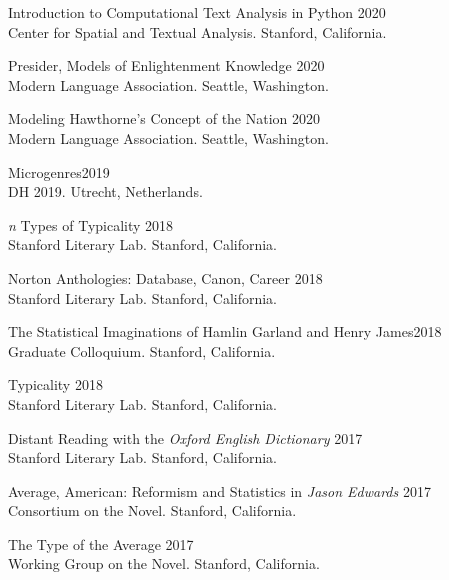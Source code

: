 \documentclass[
  12pt,
  letterpaper,
]{article}
\begin{document}
Introduction to Computational Text Analysis in Python \hfill 2020\\
\hspace*{0.333em} Center for Spatial and Textual Analysis. Stanford,
California.

Presider, Models of Enlightenment Knowledge \hfill 2020\\
\hspace*{0.333em} Modern Language Association. Seattle, Washington.

Modeling Hawthorne's Concept of the Nation \hfill 2020\\
\hspace*{0.333em} Modern Language Association. Seattle, Washington.

Microgenres\hfill 2019\\
\hspace*{0.333em} DH 2019. Utrecht, Netherlands.

\emph{n} Types of Typicality \hfill 2018\\
\hspace*{0.333em} Stanford Literary Lab. Stanford, California.

Norton Anthologies: Database, Canon, Career \hfill 2018\\
\hspace*{0.333em} Stanford Literary Lab. Stanford, California.

The Statistical Imaginations of Hamlin Garland and Henry
James\hfill 2018\\
\hspace*{0.333em} Graduate Colloquium. Stanford, California.

Typicality \hfill 2018\\
\hspace*{0.333em} Stanford Literary Lab. Stanford, California.

Distant Reading with the \emph{Oxford English Dictionary} \hfill 2017\\
\hspace*{0.333em} Stanford Literary Lab. Stanford, California.

Average, American: Reformism and Statistics in \emph{Jason Edwards}
\hfill 2017\\
\hspace*{0.333em} Consortium on the Novel. Stanford, California.

The Type of the Average \hfill 2017\\
\hspace*{0.333em} Working Group on the Novel. Stanford, California.
\end{document}
